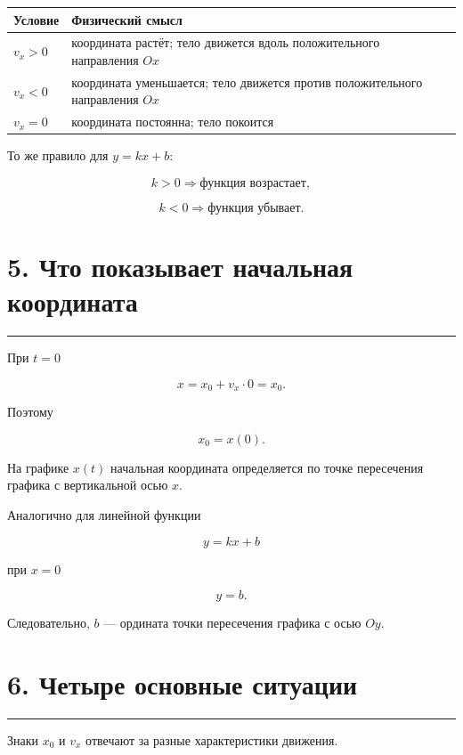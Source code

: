 \documentclass[a4paper,12pt]{article}
\newcommand{\sectionline}{%
  \par\noindent\color{accent}\rule{\linewidth}{0.5pt}\color{textgray}\par
}
\begin{document}
\begin{table}[h!]
\centering
\renewcommand{\arraystretch}{1.35}
\begin{tabularx}{\linewidth}{@{}XX@{}}
\toprule
\textbf{Условие} & \textbf{Физический смысл} \\
\midrule
\(v_x>0\) &
координата растёт; тело движется вдоль положительного направления \(Ox\) \\
\(v_x<0\) &
координата уменьшается; тело движется против положительного направления \(Ox\) \\
\(v_x=0\) &
координата постоянна; тело покоится \\
\bottomrule
\end{tabularx}
\end{table}

То же правило для \(y=kx+b\):

\[
k>0 \Rightarrow \text{функция возрастает},
\]

\[
k<0 \Rightarrow \text{функция убывает}.
\]


\section{\color{darkaccent}5. Что показывает начальная координата}
\sectionline

При \(t=0\)

\[
x=x_0+v_x\cdot0=x_0.
\]

Поэтому

\[
\boxed{x_0=x(0)}.
\]

На графике \(x(t)\) начальная координата определяется по точке пересечения
графика с вертикальной осью \(x\).

Аналогично для линейной функции

\[
y=kx+b
\]

при \(x=0\)

\[
y=b.
\]

Следовательно, \(b\) --- ордината точки пересечения графика с осью \(Oy\).


\section{\color{darkaccent}6. Четыре основные ситуации}
\sectionline

Знаки \(x_0\) и \(v_x\) отвечают за разные характеристики движения.
\end{document}
